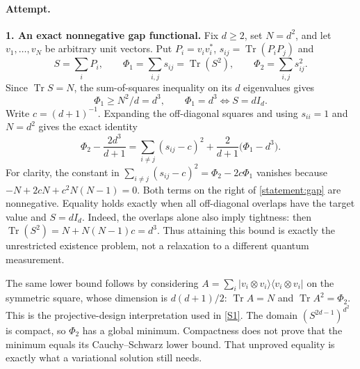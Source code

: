 \documentclass[11pt,a4paper]{article}
\newcommand{\sref}[2]{\hyperlink{source:#1:#2}{[S#2]}}
\numberwithin{equation}{section}
\begin{document}
\paragraph{Attempt.}
\textbf{1. An exact nonnegative gap functional.}
Fix $d\geq2$, set $N=d^2$, and let $v_1,\ldots,v_N$ be arbitrary unit
vectors. Put $P_i=v_iv_i^*$, $s_{ij}=\operatorname{Tr}(P_iP_j)$ and
\[
 S=\sum_iP_i,\qquad
 \Phi_1=\sum_{i,j}s_{ij}=\operatorname{Tr}(S^2),\qquad
 \Phi_2=\sum_{i,j}s_{ij}^2.
\]
Since $\operatorname{Tr}S=N$, the sum-of-squares inequality on its
$d$ eigenvalues gives
\begin{equation}\label{statement:tight}
 \Phi_1\geq N^2/d=d^3,
 \qquad \Phi_1=d^3\Longleftrightarrow S=dI_d.
\end{equation}
Write $c=(d+1)^{-1}$. Expanding the off-diagonal squares and using
$s_{ii}=1$ and $N=d^2$ gives the exact identity
\begin{equation}\label{statement:gap}
 \Phi_2-\frac{2d^3}{d+1}
 =\sum_{i\ne j}(s_{ij}-c)^2
       +\frac2{d+1}\bigl(\Phi_1-d^3\bigr).
\end{equation}
For clarity, the constant in
$\sum_{i\ne j}(s_{ij}-c)^2=\Phi_2-2c\Phi_1$
vanishes because $-N+2cN+c^2N(N-1)=0$.
Both terms on the right of \eqref{statement:gap} are nonnegative.
Equality holds exactly when all off-diagonal overlaps have the target
value and $S=dI_d$. Indeed, the overlaps alone also imply tightness:
then $\operatorname{Tr}(S^2)=N+N(N-1)c=d^3$.
Thus attaining this bound is exactly the unrestricted existence problem,
not a relaxation to a different quantum measurement.

The same lower bound follows by considering
$A=\sum_i|v_i\otimes v_i\rangle\langle v_i\otimes v_i|$ on the
symmetric square, whose dimension is $d(d+1)/2$:
$\operatorname{Tr}A=N$ and $\operatorname{Tr}A^2=\Phi_2$.
This is the projective-design interpretation used in \sref{statement}{1}.
The domain $(S^{2d-1})^{d^2}$ is compact, so $\Phi_2$ has a global
minimum. Compactness does not prove that the minimum equals its
Cauchy--Schwarz lower bound. That unproved equality is exactly what a
variational solution still needs.
\end{document}
